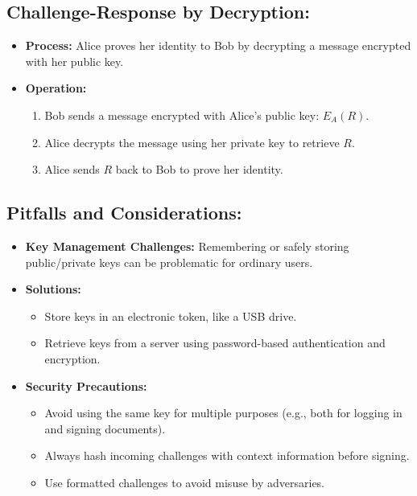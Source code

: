 \documentclass[12pt]{article}
\begin{document}
\subsection*{Challenge-Response by Decryption:}
\begin{itemize}
    \item \textbf{Process:} Alice proves her identity to Bob by decrypting a message encrypted with her public key.
    \item \textbf{Operation:}
    \begin{enumerate}
        \item Bob sends a message encrypted with Alice's public key: \( E_A(R) \).
        \item Alice decrypts the message using her private key to retrieve \( R \).
        \item Alice sends \( R \) back to Bob to prove her identity.
    \end{enumerate}
\end{itemize}

\subsection*{Pitfalls and Considerations:}
\begin{itemize}
    \item \textbf{Key Management Challenges:} Remembering or safely storing public/private keys can be problematic for ordinary users.
    \item \textbf{Solutions:}
    \begin{itemize}
        \item Store keys in an electronic token, like a USB drive.
        \item Retrieve keys from a server using password-based authentication and encryption.
    \end{itemize}
    \item \textbf{Security Precautions:}
    \begin{itemize}
        \item Avoid using the same key for multiple purposes (e.g., both for logging in and signing documents).
        \item Always hash incoming challenges with context information before signing.
        \item Use formatted challenges to avoid misuse by adversaries.
    \end{itemize}
\end{itemize}
\end{document}
